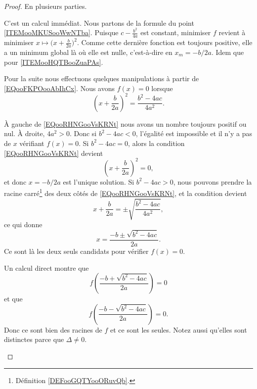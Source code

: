\begin{proof}
	En plusieurs parties.
	\begin{subproof}
		C'est un calcul immédiat.
		Nous partons de la formule du point \ref{ITEMooMKUSooWwNTba}. Puisque \( c-\frac{ b^2 }{ 4a }\) est constant, minimiser \( f\) revient à minimiser \( x\mapsto \big( x+\frac{ b }{ 2a } \big)^2\). Comme cette dernière fonction est toujours positive, elle a un minimum global là où elle est nulle, c'est-à-dire en \( x_m=-b/2a\).
		Idem que pour \ref{ITEMooHQTBooZuaPAs}.
	\end{subproof}
	Pour la suite nous effectuons quelques manipulations à partir de \eqref{EQooFKPOooAbIhCx}. Nous avons \( f(x)=0\) lorsque
	\begin{equation}        \label{EQooRHNGooVsKRNt}
		(x+\frac{ b }{ 2a })^2=\frac{ b^2-4ac }{ 4a^2 }.
	\end{equation}
	\begin{subproof}
		À gauche de \eqref{EQooRHNGooVsKRNt} nous avons un nombre toujours positif ou nul. À droite, \( 4a^2>0\). Donc si \( b^2-4ac<0\), l'égalité est impossible et il n'y a pas de \( x\) vérifiant \( f(x)=0\).
		Si \( b^2-4ac=0\), alors la condition \eqref{EQooRHNGooVsKRNt} devient
		\begin{equation}
			\left( x+\frac{ b }{ 2a } \right)^2=0,
		\end{equation}
		et donc \( x=-b/2a\) est l'unique solution.
		Si \( b^2-4ac>0\), nous pouvons prendre la racine carré\footnote{Définition \ref{DEFooGQTYooORuvQb}.} des deux côtés de \eqref{EQooRHNGooVsKRNt}, et la condition devient
		\begin{equation}
			x+\frac{ b }{ 2a }=\pm\sqrt{ \frac{ b^2-4ac }{ 4a^2 } },
		\end{equation}
		ce qui donne
		\begin{equation}
			x=\frac{ -b\pm\sqrt{ b^2-4ac } }{ 2a }.
		\end{equation}
		Ce sont là les deux seuls candidats pour vérifier \( f(x)=0\).

		Un calcul direct montre que
		\begin{equation}
			f\left( \frac{ -b+\sqrt{ b^2-4ac } }{ 2a } \right)=0
		\end{equation}
		et que
		\begin{equation}
			f\left( \frac{ -b-\sqrt{ b^2-4ac } }{ 2a } \right)=0.
		\end{equation}
		Donc ce sont bien des racines de \( f\) et ce sont les seules. Notez aussi qu'elles sont distinctes parce que \( \Delta\neq 0\).
	\end{subproof}
\end{proof}
